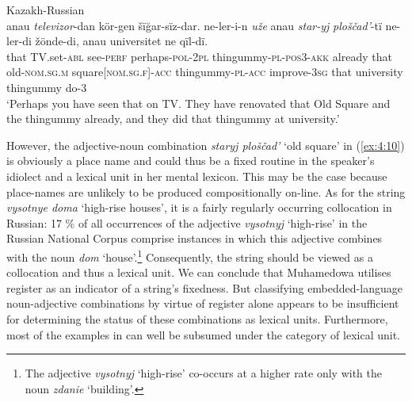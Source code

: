 \ea{\label{ex:4:10}}
Kazakh-Russian \citep[82]{muhamedowa-untersuchung-2006}\\
\gll anau \textit{televizor}-dan kör-gen šïğar-sïz-dar. ne-ler-i-n \textit{uže} anau \textit{star-yj} \textit{ploščad'}-tï ne-ler-di žönde-di, anau universitet ne qïl-dï.\\
	that {TV.set}-\textsc{abl} see-\textsc{perf} perhaps-\textsc{pol-2pl} thingummy-\textsc{pl-pos3-akk} already that old-\textsc{nom.sg.m} square[\textsc{nom.sg.f}]-\textsc{acc} thingummy-\textsc{pl-acc} improve-\textsc{3sg} that university thingummy do-\textsc{3}\\
\glt `Perhaps you have seen that on TV. They have renovated that Old Square and the thingummy already, and they did that thingummy at university.'
\z

\noindent However, the adjective-noun combination \textit{staryj ploščad'} `old square' in (\ref{ex:4:10}) is obviously a place name and could thus be a fixed routine in the speaker's idiolect and a lexical unit in her mental lexicon. This may be the case because place-names are unlikely to be produced compositionally on-line. As for the string \textit{vysotnye doma} `high-rise houses', it is a fairly regularly occurring collocation in Russian: 17 \% of all occurrences of the adjective \textit{vysotnyj} `high-rise' in the Russian National Corpus comprise instances in which this adjective combines with the noun \textit{dom} `house'.\footnote{The adjective \textit{vysotnyj} `high-rise' co-occurs at a higher rate only with the noun \textit{zdanie} `building'.} Consequently, the string should be viewed as a  collocation and thus a lexical unit. We can conclude that Muhamedowa utilises register as an indicator of a string's fixedness. But classifying embedded-language noun-adjective combinations by virtue of register alone appears to be insufficient for determining the status of these combinations as lexical units. Furthermore, most of the examples in \citet[81-88]{muhamedowa-untersuchung-2006} can well be subsumed under the category of lexical unit. 

